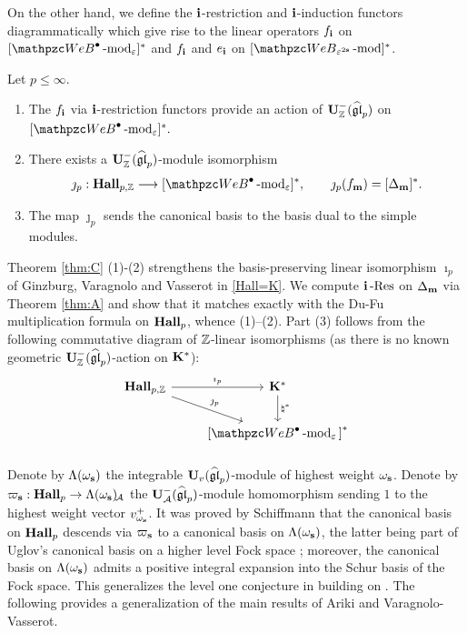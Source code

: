 On the other hand, we define the $\mathbf{i}$-restriction and $\mathbf{i}$-induction functors diagrammatically which give rise to the linear operators $f_{\mathbf{i}}$ on $[\qAW \modf_\eps]^*$ and $f_{\mathbf{i}}$ and $e_{\mathbf{i}}$ on $[\qW_{\eps^{2\bfs}} \modf]^*$. 

\begin{alphatheorem}
     \label{thm:C}
 Let $p\le \infty$.
 \begin{enumerate}
 \item The $f_{\mathbf{i}}$ via $\mathbf{i}$-restriction functors provide an action of $\bold{U}^-_{\mathbb{Z}}(\widehat{\mathfrak{gl}}_p)$ on $[\qAW\modf_\eps]^*.$
     \item 
     There exists a $\bold{U}^-_{\mathbb{Z}}(\widehat{\mathfrak{gl}}_p)$-module isomorphism
\[
\jmath_p: \HallZ \longrightarrow [\qAW\modf_\eps]^*, 
\qquad \jmath_p(f_\bfm) =[{\Delta}_\bfm]^*.
\]
\item 
The map $\jmath_p$ sends the canonical basis to the basis dual to the simple modules.
 \end{enumerate} 
\end{alphatheorem}

Theorem \ref{thm:C} (1)-(2) strengthens the basis-preserving linear isomorphism $\imath_p$ of Ginzburg, Varagnolo and Vasserot in \eqref{Hall=K}. We compute $\mathbf{i}\operatorname{-Res}\nolimits$ on ${\Delta}_{\mathbf{m}}$ via Theorem \ref{thm:A} and show that it matches exactly with the Du-Fu multiplication formula on $\bold{Hall}_{p}$, whence (1)--(2). Part (3) follows from the following commutative diagram of $\mathbb{Z}$-linear isomorphisms (as there is no known geometric $\bold{U}^-_{\mathbb{Z}}(\widehat{\mathfrak{gl}}_p)$-action on $\bf{K}^*$): 
\begin{equation}   \label{eq:ijk}
\begin{tikzcd}
\HallZ\ar[r,"\imath_p"]\ar[dr,"\jmath_p"] &\K^*\ar[d,"\natural^*"]
\\
 & {[}\qAW\modf_\eps{]}^*
\end{tikzcd} 
\end{equation}


\subsubsection{}
Denote by $\Lambda(\omega_{\mathbf{s}})$ the integrable  $\bold{U}_v(\widehat{\mathfrak{gl}}_p)$-module of highest weight $\omega_{\mathbf{s}}$. Denote by $\varpi_{\mathbf{s}}: \bold{Hall}_{p} \rightarrow \Lambda(\omega_{\mathbf{s}})\!_{\mathcal{A}}$ the $\bold{U}^-_{\mathcal{A}}(\widehat{\mathfrak{gl}}_p)$-module homomorphism sending $1$ to the highest weight vector $v^+_{\omega_{\mathbf{s}}}$. It was proved by Schiffmann \cite{Sch00} that the canonical basis on $\bold{Hall}_{p}$ descends via 
$\varpi_{\mathbf{s}}$ to a canonical basis on $\Lambda (\omega_{\mathbf{s}})$, the latter being part of Uglov's canonical basis on a higher level Fock space \cite{Ugl00}; moreover, the canonical basis on $\Lambda (\omega_{\mathbf{s}})$ admits a positive integral expansion into the Schur basis of the Fock space. This generalizes the level one conjecture in \cite{VV99} building on \cite{LT96}. The following provides a generalization of the main results of Ariki and Varagnolo-Vasserot.

